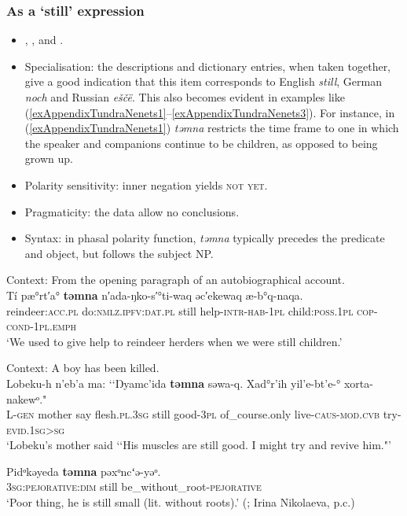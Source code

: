 \subsubsection{As a \lq{}still\rq{ }expression}
\begin{itemize}
	\item \textcite[144]{Janhunen1977}, \textcite[458]{Lehtisalo1956}, \textcite[186]{Nikolaeva2014} and \textcite[623]{Tereshchenko2008}.
	\item Specialisation: the descriptions and dictionary entries, when taken together, give a good indication that this item corresponds to English \textit{still}, German \textit{noch} and Russian \textit{eščë}. This also becomes evident in examples like (\ref{exAppendixTundraNenets1}–\ref{exAppendixTundraNenets3}). For instance, in (\ref{exAppendixTundraNenets1}) \textit{təmna} restricts the time frame to one in which the speaker and companions continue to be children, as opposed to being grown up.
	\item Polarity sensitivity: inner negation yields \textsc{not yet}.
	\item Pragmaticity: the data allow no conclusions.
	\item Syntax: in phasal polarity function, \textit{təmna} typically precedes the predicate and object, but follows the subject NP.
\end{itemize}
\begin{exe}
	\ex\label{exAppendixTundraNenets1}
	Context: From the opening paragraph of an autobiographical account.\\
	\gll Tí pæ°rt′a° \textbf{təmna} n′ada-ŋko-s′°ti-waq əc′ekewaq æ-b°q-naqa.\\
	reindeer:\textsc{acc}.\textsc{pl} do:\textsc{nmlz}.\textsc{ipfv}:\textsc{dat}.\textsc{pl} still help-\textsc{intr}-\textsc{hab}-1\textsc{pl} child:\textsc{poss}.1\textsc{pl} \textsc{cop}-\textsc{cond}-1\textsc{pl}.\textsc{emph}\\
	\glt \lq We used to give help to reindeer herders when we were still children.' \parencite[Life story]{NikolaevaEtAl2019}

	\ex\label{exAppendixTundraNenets2}
	Context: A boy has been killed.\\
	\gll Lobeku-h n'eb'a ma: \lq\lq Ŋyamc'ida \textbf{təmna} səwa-q. Xad°r'ih yil'e-bt'e-° xorta-nakewᵒ."\\
	L-\textsc{gen} mother say \phantom{\lq\lq}flesh.\textsc{pl}.3\textsc{sg} still good-3\textsc{pl} of\_course.only live-\textsc{caus}-\textsc{mod}.\textsc{cvb} try-\textsc{evid}.1\textsc{sg}>\textsc{sg}\\
	\glt \lq Lobeku's mother said \lq\lq His muscles are still good. I might try and revive him."' \parencite[453]{Nikolaeva2014}
	
	\ex\label{exAppendixTundraNenets3}
	
	\gll Pidᵒkəyeda	\textbf{təmna} pəxᵒncʻə-yəᵒ.\\
	3\textsc{sg}:\textsc{pejorative}:\textsc{dim} still be\_without\_root-\textsc{pejorative}\\
	\glt \lq Poor thing, he is still small (lit. without roots).' (\cite[138]{Nikolaeva2014}; Irina Nikolaeva, p.c.)
\end{exe}
	
